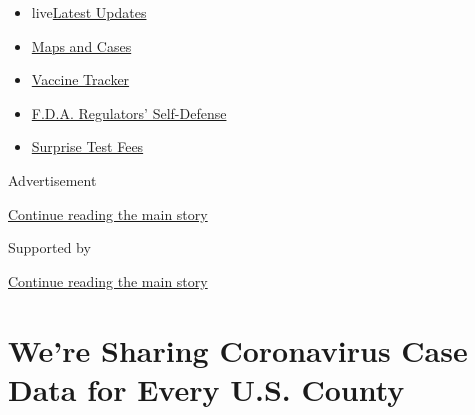 \begin{itemize}
\tightlist
\item
  live\href{https://www.nytimes3xbfgragh.onion/2020/09/11/world/covid-19-coronavirus.html?name=styln-coronavirus-national\&region=TOP_BANNER\&block=storyline_menu_recirc\&action=click\&pgtype=Article\&impression_id=606bee21-f4b7-11ea-ab3e-6b17423f7877\&variant=undefined}{Latest
  Updates}
\item
  \href{https://www.nytimes3xbfgragh.onion/interactive/2020/us/coronavirus-us-cases.html?name=styln-coronavirus-national\&region=TOP_BANNER\&block=storyline_menu_recirc\&action=click\&pgtype=Article\&impression_id=606c1530-f4b7-11ea-ab3e-6b17423f7877\&variant=undefined}{Maps
  and Cases}
\item
  \href{https://www.nytimes3xbfgragh.onion/interactive/2020/science/coronavirus-vaccine-tracker.html?name=styln-coronavirus-national\&region=TOP_BANNER\&block=storyline_menu_recirc\&action=click\&pgtype=Article\&impression_id=606c1531-f4b7-11ea-ab3e-6b17423f7877\&variant=undefined}{Vaccine
  Tracker}
\item
  \href{https://www.nytimes3xbfgragh.onion/2020/09/10/us/politics/fda-coronavirus-vaccine.html?name=styln-coronavirus-national\&region=TOP_BANNER\&block=storyline_menu_recirc\&action=click\&pgtype=Article\&impression_id=606c1532-f4b7-11ea-ab3e-6b17423f7877\&variant=undefined}{F.D.A.
  Regulators' Self-Defense}
\item
  \href{https://www.nytimes3xbfgragh.onion/2020/09/09/upshot/coronavirus-surprise-test-fees.html?name=styln-coronavirus-national\&region=TOP_BANNER\&block=storyline_menu_recirc\&action=click\&pgtype=Article\&impression_id=606c1533-f4b7-11ea-ab3e-6b17423f7877\&variant=undefined}{Surprise
  Test Fees}
\end{itemize}

Advertisement

\protect\hyperlink{after-top}{Continue reading the main story}

Supported by

\protect\hyperlink{after-sponsor}{Continue reading the main story}

\hypertarget{were-sharing-coronavirus-case-data-for-every-us-county}{%
\section{We're Sharing Coronavirus Case Data for Every U.S.
County}\label{were-sharing-coronavirus-case-data-for-every-us-county}}

